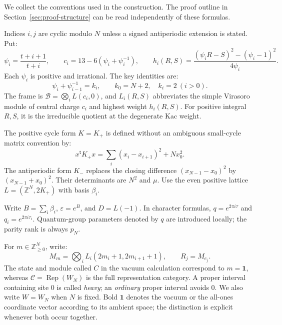 \documentclass[11pt,a4paper]{article}
\numberwithin{equation}{section}
\theoremstyle{definition}\newtheorem{definition}[theorem]{Definition}
\theoremstyle{remark}\newtheorem{remark}[theorem]{Remark}
\newcommand{\parityrank}{p_N}
\begin{document}
We collect the conventions used in the construction. The proof outline
in Section~\ref{sec:proof-structure} can be read independently of
these formulas.

Indices $i,j$ are cyclic modulo $N$ unless a signed antiperiodic
extension is stated. Put:
\[
 \psi_i=\frac{t+i+1}{t+i},\qquad
 c_i=13-6(\psi_i+\psi_i^{-1}),\qquad
 h_i(R,S)=\frac{(\psi_iR-S)^2-(\psi_i-1)^2}{4\psi_i}.
\]
Each $\psi_i$ is positive and irrational. The key identities are:
\[
 \psi_i+\psi_{i-1}^{-1}=k_i,\qquad
 k_0=N+2,\quad k_i=2\ (i>0).
\]
The frame is $\mathcal B=\bigotimes_iL(c_i,0)$, and
$L_i(R,S)$ abbreviates the simple Virasoro module of central charge
$c_i$ and highest weight $h_i(R,S)$. For positive integral $R,S$,
it is the irreducible quotient at the degenerate Kac weight.

The positive cycle form $K=K_+$ is defined without an ambiguous
small-cycle matrix convention by:
\[
 x^{\mathsf t}K_+x=\sum_i(x_i-x_{i+1})^2+Nx_0^2.
\]
The antiperiodic form $K_-$ replaces the closing difference
$(x_{N-1}-x_0)^2$ by $(x_{N-1}+x_0)^2$.
Their determinants are $N^2$ and $\mu$.
Use the even positive lattice $L=(\mathbb Z^N,2K_+)$ with basis $\beta_i$.

Write $B=\sum_i\beta_i$, $\varepsilon=e^B$, and $D=L(-1)$.
In character formulas, $q=e^{2\pi i\tau}$ and
$q_i=e^{2\pi i\tau_i}$. Quantum-group parameters denoted by $q$
are introduced locally; the parity rank is always $\parityrank$.

For $m\in\mathbb Z_{\geq0}^N$, write:
\[
 M_m=\bigotimes_iL_i(2m_i+1,2m_{i+1}+1),\qquad R_j=M_{e_j}.
\]
The state and module called $C$ in the vacuum calculation correspond
to $m=\mathbf1$, whereas $\mathcal C=\operatorname{Rep}(W_N)$ is
the full representation category. A proper interval containing site
$0$ is called \emph{heavy}; an \emph{ordinary} proper interval avoids
$0$. We also write $W=W_N$ when $N$ is fixed. Bold $\mathbf1$ denotes
the vacuum or the all-ones coordinate vector according to its ambient
space; the distinction is explicit whenever both occur together.
\end{document}
